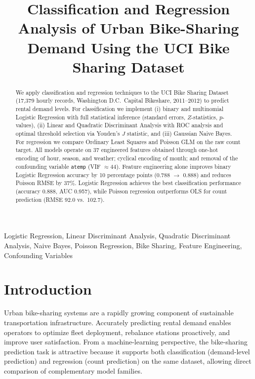\documentclass[conference]{IEEEtran}
\title{Classification and Regression Analysis of Urban Bike-Sharing Demand Using the UCI Bike Sharing Dataset}
\author{
\IEEEauthorblockN{Gabil Gurbanov \hspace{0.6em} Abdulla Akhundzada}
\IEEEauthorblockA{Applied Machine Learning \& Data Analytics (CSCI-6767)\\
Spring 2026 \quad Instructor: Dr.\ Samir Rustamov}
}
\begin{document}
\maketitle

\begin{abstract}
We apply classification and regression techniques to the UCI Bike Sharing Dataset (17,379 hourly records, Washington D.C.\ Capital Bikeshare, 2011--2012) to predict rental demand levels.
For classification we implement (i) binary and multinomial Logistic Regression with full statistical inference (standard errors, $Z$-statistics, $p$-values), (ii) Linear and Quadratic Discriminant Analysis with ROC analysis and optimal threshold selection via Youden's $J$ statistic, and (iii) Gaussian Naive Bayes.
For regression we compare Ordinary Least Squares and Poisson GLM on the raw count target.
All models operate on 37 engineered features obtained through one-hot encoding of hour, season, and weather; cyclical encoding of month; and removal of the confounding variable \texttt{atemp} (VIF $\approx 44$).
Feature engineering alone improves binary Logistic Regression accuracy by 10 percentage points (0.788 $\to$ 0.888) and reduces Poisson RMSE by 37\%.
Logistic Regression achieves the best classification performance (accuracy 0.888, AUC 0.957), while Poisson regression outperforms OLS for count prediction (RMSE 92.0 vs.\ 102.7).
\end{abstract}

\begin{IEEEkeywords}
Logistic Regression, Linear Discriminant Analysis, Quadratic Discriminant Analysis, Naive Bayes, Poisson Regression, Bike Sharing, Feature Engineering, Confounding Variables
\end{IEEEkeywords}

\section{Introduction}
Urban bike-sharing systems are a rapidly growing component of sustainable transportation infrastructure.
Accurately predicting rental demand enables operators to optimize fleet deployment, rebalance stations proactively, and improve user satisfaction.
From a machine-learning perspective, the bike-sharing prediction task is attractive because it supports both classification (demand-level prediction) and regression (count prediction) on the same dataset, allowing direct comparison of complementary model families.
\end{document}
